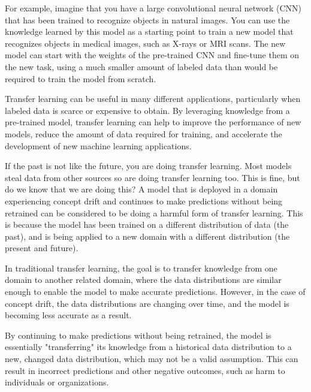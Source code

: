For example, imagine that you have a large convolutional neural network (CNN) that has been trained to recognize objects in natural images. You can use the knowledge learned by this model as a starting point to train a new model that recognizes objects in medical images, such as X-rays or MRI scans. The new model can start with the weights of the pre-trained CNN and fine-tune them on the new task, using a much smaller amount of labeled data than would be required to train the model from scratch.

Transfer learning can be useful in many different applications, particularly when labeled data is scarce or expensive to obtain. By leveraging knowledge from a pre-trained model, transfer learning can help to improve the performance of new models, reduce the amount of data required for training, and accelerate the development of new machine learning applications.

If the past is not like the future, you are doing transfer learning. Most models steal data from other sources so are doing transfer learning too. This is fine, but do we know that we are doing this? A model that is deployed in a domain experiencing concept drift and continues to make predictions without being retrained can be considered to be doing a harmful form of transfer learning. This is because the model has been trained on a different distribution of data (the past), and is being applied to a new domain with a different distribution (the present and future).

In traditional transfer learning, the goal is to transfer knowledge from one domain to another related domain, where the data distributions are similar enough to enable the model to make accurate predictions. However, in the case of concept drift, the data distributions are changing over time, and the model is becoming less accurate as a result. 

By continuing to make predictions without being retrained, the model is essentially "transferring" its knowledge from a historical data distribution to a new, changed data distribution, which may not be a valid assumption. This can result in incorrect predictions and other negative outcomes, such as harm to individuals or organizations. 

